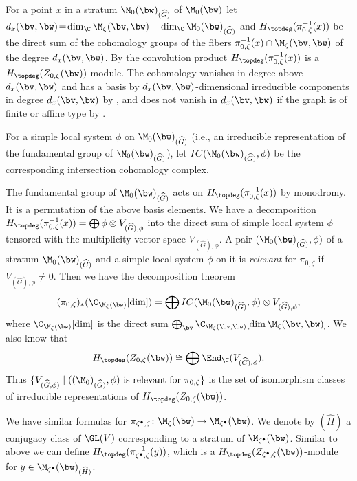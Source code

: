 For a point $x$ in a stratum $\M_0(\bw)_{(\widehat G)}$ of
$\M_0(\bw)$ let $d_x(\bv,\bw)\! =\! \dim_\C \M_\zeta(\bv,\bw)
-\linebreak[2] \dim_\C \M_0(\bw)_{(\widehat G)}$ and
$H_\topdeg(\pi_{0,\zeta}^{-1}(x))$ be the direct sum of the cohomology
groups of the f\/ibers $\pi_{0,\zeta}^{-1}(x)\cap\M_\zeta(\bv,\bw)$ of
the degree $d_x(\bv,\bw)$.  By the convolution product
$H_\topdeg(\pi_{0,\zeta}^{-1}(x))$ is a
$H_\topdeg(Z_{0,\zeta}(\bw))$-module. The cohomology vanishes in
degree above $d_x(\bv,\bw)$ and has a basis by
$d_x(\bv,\bw)$-dimensional irreducible components in degree
$d_x(\bv,\bw)$ by , and does not vanish in
$d_x(\bv,\bw)$ if the graph is of f\/inite or af\/f\/ine type by
.

For a simple local system $\phi$ on $\M_0(\bw)_{(\widehat G)}$ (i.e.,
an irreducible representation of the fundamental group of
$\M_0(\bw)_{(\widehat G)}$), let $IC(\M_0(\bw)_{(\widehat G)}, \phi)$
be the corresponding intersection cohomology complex.

The fundamental group of $\M_0(\bw)_{(\widehat G)}$ acts on
$H_\topdeg(\pi_{0,\zeta}^{-1}(x))$ by monodromy. It is a permutation
of the above basis elements. We have a decomposition
\(
  H_\topdeg(\pi_{0,\zeta}^{-1}(x)) = \bigoplus \phi\otimes V_{(\widehat{G}),\phi}
\)
into the direct sum of simple local system $\phi$ tensored with the
multiplicity vector space $V_{(\widehat G),\phi}$.
%
A pair $(\M_0(\bw)_{(\widehat G)},\phi)$ of a stratum
$\M_0(\bw)_{(\widehat G)}$ and a simple local system $\phi$ on it is
{\it relevant\/} for $\pi_{0,\zeta}$ if $V_{(\widehat G),\phi}\neq 0$.
%
Then we have the decomposition theorem
\begin{equation*}
  (\pi_{0,\zeta})_*(\C_{\M_\zeta(\bw)}[\dim])
  = \bigoplus IC(\M_0(\bw)_{(\widehat G)},\phi) \otimes V_{(\widehat
    G),\phi},
\end{equation*}
where $\C_{\M_\zeta(\bw)}[\dim]$ is the direct sum
$\bigoplus_\bv \C_{\M_\zeta(\bv,\bw)}[\dim \M_\zeta(\bv,\bw)]$.
%
We also know \cite[8.9.8]{CG} that
\begin{equation}\label{eq:convalg}
  H_{\topdeg}(Z_{0,\zeta}(\bw)) \cong \bigoplus \End_\C(V_{(\widehat G),\phi}).
\end{equation}
Thus $\{ V_{(\widehat G,\phi)} \mid \text{$((\M_0)_{(\widehat
    G)},\phi)$ is relevant for $\pi_{0,\zeta}$}\}$ is the set of
isomorphism classes of irreducible representations of
$H_{\topdeg}(Z_{0,\zeta}(\bw))$.

We have similar formulas for $\pi_{\zeta^\bullet,\zeta}\colon
\M_{\zeta}(\bw)\to \M_{\zeta^\bullet}(\bw)$. We denote by $(\widehat H)$
a conjugacy class of $\GL(V)$ corresponding to a stratum of
$\M_{\zeta^\bullet}(\bw)$.
%
Similar to above we can def\/ine
$H_{\topdeg}(\pi_{\zeta^\bullet,\zeta}^{-1}(y))$, which is a
$H_\topdeg(Z_{\zeta^\bullet,\zeta}(\bw))$-module for
$y\in \M_{\zeta^\bullet}(\bw)_{(\widehat H)}$.

